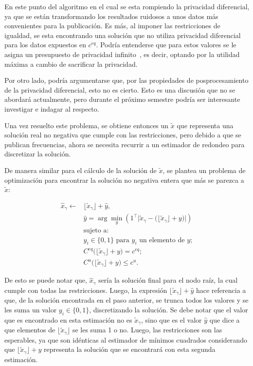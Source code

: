 \documentclass[informe]{upropuesta}
\begin{document}
En este punto del algoritmo en el cual se esta rompiendo la privacidad diferencial, ya que se están transformando los resultados ruidosos a unos datos más convenientes para la publicación. Es más, al imponer las restricciones de igualdad, se esta encontrando una solución que no utiliza privacidad diferencial para los datos expuestos en $c^{eq}$. Podría entenderse que para estos valores se le asigna un presupuesto de privacidad infinito~\cite{Abowd2022}, es decir, optando por la utilidad máxima a cambio de sacrificar la privacidad.

Por otro lado, podría argumentarse que, por las propiedades de posprocesamiento de la privacidad diferencial, esto no es cierto. Esto es una discusión que no se abordará actualmente, pero durante el próximo semestre podría ser interesante investigar e indagar al respecto.

Una vez resuelto este problema, se obtiene entonces un $\tilde{x}$ que representa una solución real no negativa que cumple con las restricciones, pero debido a que se publican frecuencias, ahora se necesita recurrir a un estimador de redondeo para discretizar la solución.

De manera similar para el cálculo de la solución de $\tilde{x}$, se plantea un problema de optimización para encontrar la solución no negativa entera que más se parezca a $\tilde{x}$:

\begin{equation}
    \begin{aligned}
        \hat{x}_{\gamma} \leftarrow &\lfloor \tilde{x}_{\gamma} \rfloor + \hat{y}, \\
        &\hat{y} = \arg\min_{y} \left( 1^\top \big|\tilde{x}_{\gamma} - \big( \lfloor \tilde{x}_{\gamma} \rfloor + y \big) \big| \right) \\
        &\text{sujeto a:} \\
        &y_i \in \{0, 1\} \text{ para } y_i \text{ un elemento de } y; \\
        &C^{eq} \big( \lfloor \tilde{x}_{\gamma} \rfloor + y \big) = c^{eq}; \\
        &C^u \big( \lfloor \tilde{x}_{\gamma} \rfloor + y \big) \leq c^u.
    \end{aligned}
\end{equation}

De esto se puede notar que, $\hat{x}_{\gamma}$ sería la solución final para el nodo raíz, la cual cumple con todas las restricciones. Luego, la expresión $\lfloor \tilde{x}_{\gamma} \rfloor + \hat{y}$ hace referencia a que, de la solución encontrada en el paso anterior, se trunca todos los valores y se les suma un valor $y_i \in  \{0, 1\}$, discretizando la solución. Se debe notar que el valor que es encontrado en esta estimación no es $\tilde{x}_{\gamma}$, sino que es el valor $\hat{y}$ que dice a que elementos de $\lfloor \tilde{x}_{\gamma} \rfloor$ se les suma 1 o no. Luego, las restricciones son las esperables, ya que son idénticas al estimador de mínimos cuadrados considerando que $\lfloor \tilde{x}_{\gamma} \rfloor + y$ representa la solución que se encontrará con esta segunda estimación.
\end{document}
